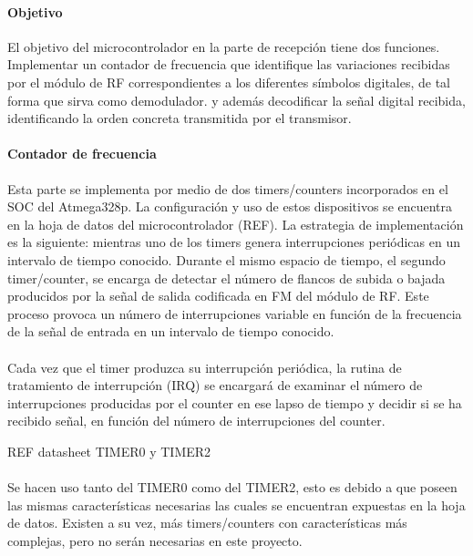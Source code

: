 \paragraph{Objetivo} El objetivo del microcontrolador en la parte de recepción tiene dos funciones. Implementar un contador de frecuencia que identifique las variaciones recibidas por el m\'odulo de RF correspondientes a los diferentes s\'imbolos digitales, de tal forma que sirva como demodulador. y además decodificar la señal digital recibida, identificando la orden concreta transmitida por el transmisor.

\paragraph{Contador de frecuencia} Esta parte se implementa por medio de dos timers/counters incorporados en el SOC del Atmega328p. La configuraci\'on y uso de estos dispositivos se encuentra en la hoja de datos del microcontrolador (REF). La estrategia de implementación es la siguiente: mientras uno de los timers genera interrupciones periódicas en un intervalo de tiempo conocido. Durante el mismo espacio de tiempo, el segundo timer/counter, se encarga de detectar el número de flancos de subida o bajada producidos por la señal de salida codificada en FM del módulo de RF. Este proceso provoca un número de interrupciones variable en función de la frecuencia de la señal de entrada en un intervalo de tiempo conocido.

\paragraph{} Cada vez que el timer produzca su interrupción periódica, la rutina de tratamiento de interrupción (IRQ) se encargará de examinar el número de interrupciones producidas por el counter en ese lapso de tiempo y decidir si se ha recibido señal, en función del número de interrupciones del counter.

REF datasheet TIMER0 y TIMER2
\paragraph{} Se hacen uso tanto del TIMER0 como del TIMER2, esto es debido a que poseen las mismas caracter\'isticas necesarias las cuales se encuentran expuestas en la hoja de datos. Existen a su vez, más timers/counters con características más complejas, pero no serán necesarias en este proyecto.
